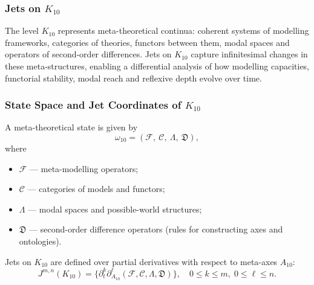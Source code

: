 
\subsubsection{Jets on $K_{10}$}
\label{sec:jets-k10}

The level $K_{10}$ represents meta-theoretical continua: coherent systems
of modelling frameworks, categories of theories, functors between them,
modal spaces and operators of second-order differences. Jets on $K_{10}$
capture infinitesimal changes in these meta-structures, enabling a
differential analysis of how modelling capacities, functorial stability,
modal reach and reflexive depth evolve over time.


\subsubsection{State Space and Jet Coordinates of $K_{10}$}

A meta-theoretical state is given by
\[
\omega_{10}
=
(\mathcal{F},\ \mathcal{C},\ \Lambda,\ \mathfrak{D}),
\]
where
\begin{itemize}
    \item $\mathcal{F}$ — meta-modelling operators;
    \item $\mathcal{C}$ — categories of models and functors;
    \item $\Lambda$ — modal spaces and possible-world structures;
    \item $\mathfrak{D}$ — second-order difference operators 
          (rules for constructing axes and ontologies).
\end{itemize}

Jets on $K_{10}$ are defined over partial derivatives with respect to
meta-axes $A_{10}$:
\[
J^{m,n}(K_{10}) =
\{\partial_t^k \partial_{A_{10}}^\ell 
(\mathcal{F},\mathcal{C},\Lambda,\mathfrak{D})
\},
\quad
0\le k\le m,\;
0\le\ell\le n.
\]


